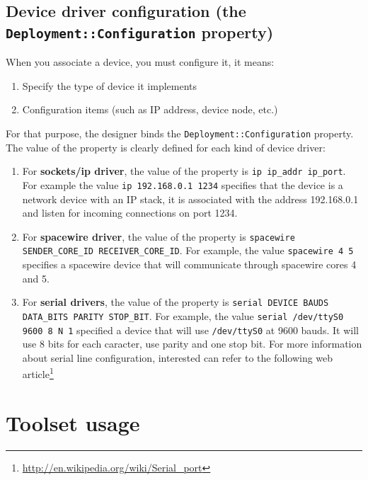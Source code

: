 \documentclass[11pt]{book}
\begin{document}
      \section{Device driver configuration (the
      \texttt{Deployment::Configuration} property)}
      When you associate a device, you must configure it, it means:
      \begin{enumerate}
         \item
            Specify the type of device it implements
         \item
            Configuration items (such as IP address, device node, etc.)
      \end{enumerate}

      For that purpose, the designer binds the
      \texttt{Deployment::Configuration} property. The value of the property is clearly
      defined for each kind of device driver:
      \begin{enumerate}
         \item
            For \textbf{sockets/ip driver}, the value of the property is \texttt{ip
            ip\_addr ip\_port}. For example the value \texttt{ip 192.168.0.1 1234}
            specifies that the device is a network device with an IP stack, it
            is associated with the address 192.168.0.1 and listen for incoming
            connections on port 1234.
         \item
            For \textbf{spacewire driver}, the value of the property is
            \texttt{spacewire SENDER\_CORE\_ID RECEIVER\_CORE\_ID}. For example,
            the value \texttt{spacewire 4 5} specifies a spacewire device that
            will communicate through spacewire cores 4 and 5.
         \item
            For \textbf{serial drivers}, the value of the property is
            \texttt{serial DEVICE BAUDS  DATA\_BITS PARITY STOP\_BIT}. For
            example, the value \texttt{serial /dev/ttyS0 9600 8 N 1} specified a
            device that will use \texttt{/dev/ttyS0} at 9600 bauds. It will use
            8 bits for each caracter, use parity and one stop bit. For more
            information about serial line configuration, interested can refer to
            the following web
            article\footnote{\url{http://en.wikipedia.org/wiki/Serial\_port}}
      \end{enumerate}

\chapter{Toolset usage}
\end{document}
